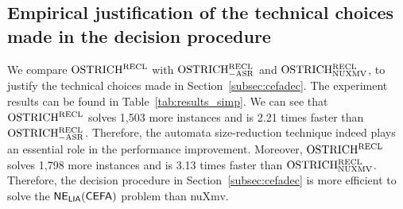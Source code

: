 \subsection{Empirical justification of the technical choices made in the decision procedure}\label{subsec:size_reduction_eval}
%
We compare $\rm OSTRICH^{RECL}$ with $\rm OSTRICH^{RECL}_{\rm -ASR}$ and $\rm OSTRICH^{RECL}_{\rm NUXMV}$, to justify the technical choices made in Section~\ref{subsec:cefadec}. 
The experiment results can be found in Table~\ref{tab:results_simp}. 
We can see that $\rm OSTRICH^{RECL}$ solves 1,503 more instances and is 2.21 times faster than $\rm OSTRICH^{RECL}_{\rm -ASR}$. Therefore, the automata size-reduction technique indeed plays an essential role in the performance improvement. 
Moreover, $\rm OSTRICH^{RECL}$ solves 1,798 more instances and is 3.13 times faster than $\rm OSTRICH^{RECL}_{\rm NUXMV}$. Therefore, the decision procedure in Section~\ref{subsec:cefadec} is more efficient to solve the ${\sf NE_{LIA}(CEFA)}$ problem than nuXmv. 

